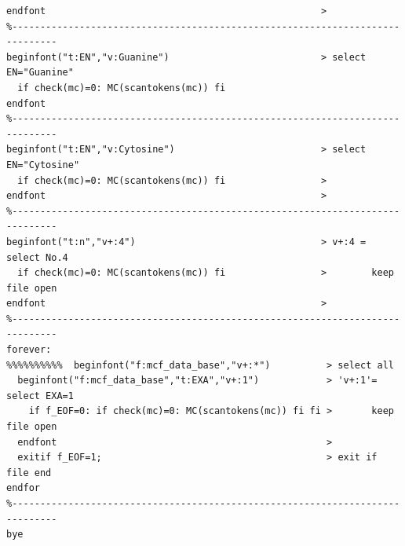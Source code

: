 \documentclass[a4paper]{article}
\begin{document}
\begin{verbatim}
endfont                                                 >
%------------------------------------------------------------------------------
beginfont("t:EN","v:Guanine")                           > select EN="Guanine"
  if check(mc)=0: MC(scantokens(mc)) fi                 
endfont
%------------------------------------------------------------------------------
beginfont("t:EN","v:Cytosine")                          > select EN="Cytosine"
  if check(mc)=0: MC(scantokens(mc)) fi                 >
endfont                                                 >
%------------------------------------------------------------------------------
beginfont("t:n","v+:4")                                 > v+:4 = select No.4
  if check(mc)=0: MC(scantokens(mc)) fi                 >        keep file open
endfont                                                 >
%------------------------------------------------------------------------------
forever:
%%%%%%%%%%  beginfont("f:mcf_data_base","v+:*")          > select all
  beginfont("f:mcf_data_base","t:EXA","v+:1")            > 'v+:1'= select EXA=1
    if f_EOF=0: if check(mc)=0: MC(scantokens(mc)) fi fi >       keep file open
  endfont                                                >    
  exitif f_EOF=1;                                        > exit if file end
endfor
%------------------------------------------------------------------------------
bye
\end{verbatim}
\noindent%
\newpage
\end{document}
